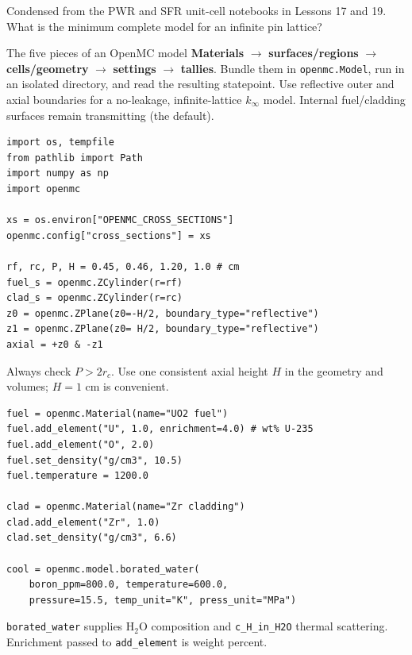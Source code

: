 \documentclass{ne630handout}
\begin{document}
\fontsize{8.7}{10.25}\selectfont
\RaggedRight

 {Condensed from the PWR and SFR unit-cell notebooks in Lessons 17 and 19.}
 {What is the minimum complete model for an infinite pin lattice?}

\begin{KeyBox}{The five pieces of an OpenMC model}
\textbf{Materials} $\rightarrow$ \textbf{surfaces/regions} $\rightarrow$ \textbf{cells/geometry}
$\rightarrow$ \textbf{settings} $\rightarrow$ \textbf{tallies}.  Bundle them in
\texttt{openmc.Model}, run in an isolated directory, and read the resulting statepoint.
Use reflective outer and axial boundaries for a no-leakage, infinite-lattice $k_\infty$ model.
Internal fuel/cladding surfaces remain transmitting (the default).
\end{KeyBox}

\colstart
{}
\begin{lstlisting}
import os, tempfile
from pathlib import Path
import numpy as np
import openmc

xs = os.environ["OPENMC_CROSS_SECTIONS"]
openmc.config["cross_sections"] = xs

rf, rc, P, H = 0.45, 0.46, 1.20, 1.0 # cm
fuel_s = openmc.ZCylinder(r=rf)
clad_s = openmc.ZCylinder(r=rc)
z0 = openmc.ZPlane(z0=-H/2, boundary_type="reflective")
z1 = openmc.ZPlane(z0= H/2, boundary_type="reflective")
axial = +z0 & -z1
\end{lstlisting}
Always check $P>2r_c$.  Use one consistent axial height $H$ in the
geometry and volumes; $H=1$ cm is convenient.

\begin{lstlisting}
fuel = openmc.Material(name="UO2 fuel")
fuel.add_element("U", 1.0, enrichment=4.0) # wt% U-235
fuel.add_element("O", 2.0)
fuel.set_density("g/cm3", 10.5)
fuel.temperature = 1200.0

clad = openmc.Material(name="Zr cladding")
clad.add_element("Zr", 1.0)
clad.set_density("g/cm3", 6.6)

cool = openmc.model.borated_water(
    boron_ppm=800.0, temperature=600.0,
    pressure=15.5, temp_unit="K", press_unit="MPa")
\end{lstlisting}
\texttt{borated\_water} supplies H$_2$O composition and
\texttt{c\_H\_in\_H2O} thermal scattering.  Enrichment passed to
\texttt{add\_element} is weight percent.
\end{document}
